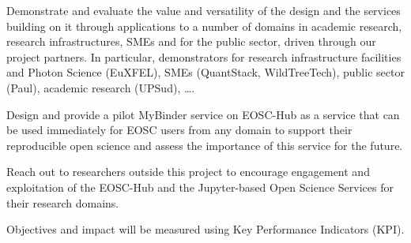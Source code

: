 \begin{compactenum}



\item \label{aim:demonstrators}%
  Demonstrate and evaluate the value and versatility of the design and
  the services building on it through applications to a number of
  domains in academic research, research infrastructures, SMEs and for
  the public sector, driven through our project partners. In
  particular, demonstrators for research infrastructure facilities and
  Photon Science (EuXFEL), SMEs (QuantStack, WildTreeTech), public
  sector (Paul), academic research (UPSud), \ldots.


\item \label{aim:binderservice}%
  Design and provide a pilot MyBinder service on EOSC-Hub as a service
  that can be used immediately for EOSC users from any domain to
  support their reproducible open science and assess the importance of
  this service for the future.

\item \label{aim:outreach-and-engagement} Reach out to researchers
  outside this project to encourage engagement and exploitation of the
  EOSC-Hub and the Jupyter-based Open Science Services for their
  research domains.


\end{compactenum}

Objectives and impact will be measured using Key Performance
Indicators (KPI).

